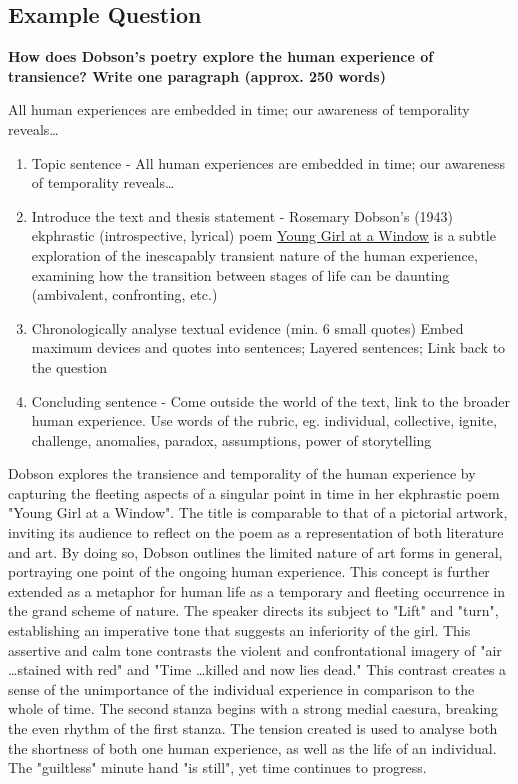 	\subsection{Example Question} \label{(cont.) 6/11/2024}
		\textbf{How does Dobson's poetry explore the human experience of transience? Write one paragraph (approx. 250 words)}

		All human experiences are embedded in time; our awareness of temporality reveals\dots
		\begin{enumerate}
			\item Topic sentence - All human experiences are embedded in time; our awareness of temporality reveals\dots
			\item Introduce the text and thesis statement - Rosemary Dobson's (1943) ekphrastic (introspective, lyrical) poem \underline{Young Girl at a Window} is a subtle exploration of the inescapably transient nature of the human experience, examining how the transition between stages of life can be daunting (ambivalent, confronting, etc.)
			\item Chronologically analyse textual evidence (min. 6 small quotes)
				\subitem Embed maximum devices and quotes into sentences; Layered sentences; Link back to the question
			\item Concluding sentence - Come outside the world of the text, link to the broader human experience. Use words of the rubric, eg. individual, collective, ignite, challenge, anomalies, paradox, assumptions, power of storytelling
		\end{enumerate}

	Dobson explores the transience and temporality of the human experience by capturing the fleeting aspects of a singular point in time in her ekphrastic poem "Young Girl at a Window". The title is comparable to that of a pictorial artwork, inviting its audience to reflect on the poem as a representation of both literature and art. By doing so, Dobson outlines the limited nature of art forms in general, portraying one point of the ongoing human experience. This concept is further extended as a metaphor for human life as a temporary and fleeting occurrence in the grand scheme of nature. The speaker directs its subject to "Lift" and "turn", establishing an imperative tone that suggests an inferiority of the girl. This assertive and calm tone contrasts the violent and confrontational imagery of "air \dots stained with red" and "Time \dots killed and now lies dead." This contrast creates a sense of the unimportance of the individual experience in comparison to the whole of time. The second stanza begins with a strong medial caesura, breaking the even rhythm of the first stanza. The tension created is used to analyse both the shortness of both one human experience, as well as the life of an individual. The "guiltless" minute hand "is still", yet time continues to progress.

